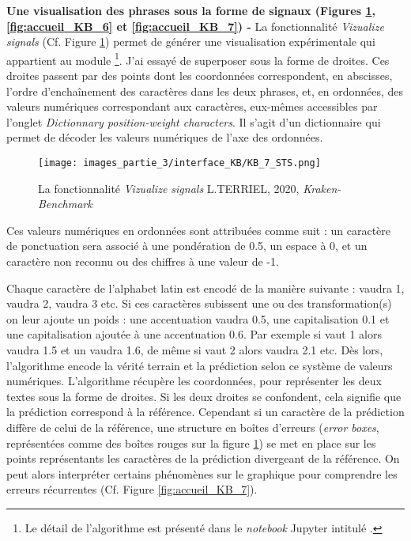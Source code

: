 \textbf{Une visualisation des phrases sous la forme de signaux (Figures \ref{fig:accueil_KB_5},  \ref{fig:accueil_KB_6} et \ref{fig:accueil_KB_7}) - } La fonctionnalité \textit{Vizualize signals} (Cf. Figure \ref{fig:accueil_KB_5}) permet de générer une visualisation expérimentale qui appartient au module \footnote{Le détail de l'algorithme est présenté dans le \textit{notebook} Jupyter intitulé .}. 
J'ai essayé de superposer sous la forme de droites. Ces droites passent par des points dont les coordonnées correspondent, en abscisses, l'ordre d'enchaînement des caractères dans les deux phrases, et, en ordonnées, des valeurs numériques correspondant aux caractères, eux-mêmes accessibles par l'onglet \textit{Dictionnary position-weight characters}. Il s'agit d'un dictionnaire qui permet de décoder les valeurs numériques de l'axe des ordonnées.\\ 

\begin{figure}[h!]
    \centering
    \texttt{[image: images\_partie\_3/interface\_KB/KB\_7\_STS.png]}
        \caption{La fonctionnalité \textit{Vizualize signals} \textcopyright L.TERRIEL, 2020, \textit{Kraken-Benchmark}}
        \label{fig:accueil_KB_5}
\end{figure}
\newpage
Ces valeurs numériques en ordonnées sont attribuées comme suit : un caractère de ponctuation sera associé à une pondération de 0.5, un espace à 0, et un caractère non reconnu ou des chiffres à une valeur de -1.

Chaque caractère de l'alphabet latin est encodé de la manière suivante :  vaudra 1,  vaudra 2,  vaudra 3 etc. 
Si ces caractères subissent une ou des transformation(s) on leur ajoute un poids : une accentuation vaudra 0.5, une capitalisation 0.1 et une capitalisation ajoutée à une accentuation 0.6. Par exemple si  vaut 1 alors  vaudra 1.5 et un  vaudra 1.6, de même si  vaut 2 alors  vaudra 2.1 etc.
Dès lors, l'algorithme encode la vérité terrain et la prédiction selon ce système de valeurs numériques. L'algorithme récupère les coordonnées, pour représenter les deux textes sous la forme de droites. 
Si les deux droites se confondent, cela signifie que la prédiction correspond à la référence. Cependant si un caractère de la prédiction diffère de celui de la référence, une structure en boîtes d'erreurs (\textit{error boxes}, représentées comme des boîtes rouges sur la figure \ref{fig:accueil_KB_5}) se met en place sur les points représentants les caractères de la prédiction divergeant de la référence. On peut alors interpréter certains phénomènes sur le graphique pour comprendre les erreurs récurrentes (Cf. Figure \ref{fig:accueil_KB_7}).\\

